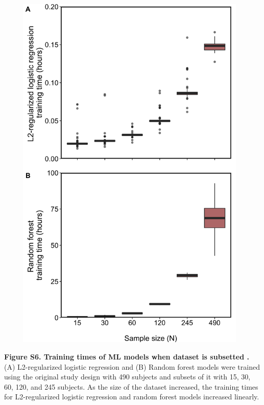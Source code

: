 \documentclass[11pt,]{article}
\begin{document}
\includegraphics[height=17.5cm, width=13cm]{Figure_S6.png}

\textbf{Figure S6. Training times of ML models when dataset is subsetted
.} (A) L2-regularized logistic regression and (B) Random forest models
were trained using the original study design with 490 subjects and
subsets of it with 15, 30, 60, 120, and 245 subjects. As the size of the
dataset increased, the training times for L2-regularized logistic
regression and random forest models increased linearly.

\newpage

\captionsetup{labelformat=empty}
\small
\end{document}
